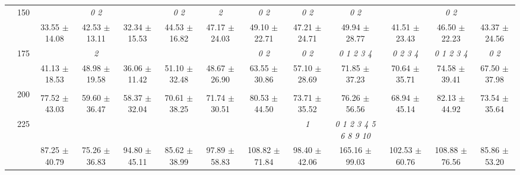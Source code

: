 \begin{table}[h]
{\begin{tabular}{
        ccccccccccccc}
 & \multirow{2}{*}{150}& & \textit{ 0 2 }& & \textit{ 0 2 }& \textit{ 2 }& \textit{ 0 2 }& \textit{ 0 2 }& \textit{ 0 2 }& & \textit{ 0 2 }&  \\ 
 & & 33.55 $\pm$ 14.08& 42.53 $\pm$ 13.11& 32.34 $\pm$ 15.53& 44.53 $\pm$ 16.82& 47.17 $\pm$ 24.03& 49.10 $\pm$ 22.71& 47.21 $\pm$ 24.71& 49.94 $\pm$ 28.77& 41.51 $\pm$ 23.43& 46.50 $\pm$ 22.23& 43.37 $\pm$ 24.56 \\ 
 & \multirow{2}{*}{175}& \cellcolor[HTML]{EFEFEF} & \cellcolor[HTML]{EFEFEF} \textit{ 2 }& \cellcolor[HTML]{EFEFEF} & \cellcolor[HTML]{EFEFEF} & \cellcolor[HTML]{EFEFEF} & \cellcolor[HTML]{EFEFEF} \textit{ 0 2 }& \cellcolor[HTML]{EFEFEF} \textit{ 0 2 }& \cellcolor[HTML]{EFEFEF} \textit{ 0 1 2 3 4 }& \cellcolor[HTML]{EFEFEF} \textit{ 0 2 3 4 }& \cellcolor[HTML]{EFEFEF} \textit{ 0 1 2 3 4 }& \cellcolor[HTML]{EFEFEF} \textit{ 0 2 } \\ 
 & & \cellcolor[HTML]{EFEFEF} 41.13 $\pm$ 18.53& \cellcolor[HTML]{EFEFEF} 48.98 $\pm$ 19.58& \cellcolor[HTML]{EFEFEF} 36.06 $\pm$ 11.42& \cellcolor[HTML]{EFEFEF} 51.10 $\pm$ 32.48& \cellcolor[HTML]{EFEFEF} 48.67 $\pm$ 26.90& \cellcolor[HTML]{EFEFEF} 63.55 $\pm$ 30.86& \cellcolor[HTML]{EFEFEF} 57.10 $\pm$ 28.69& \cellcolor[HTML]{EFEFEF} 71.85 $\pm$ 37.23& \cellcolor[HTML]{EFEFEF} 70.64 $\pm$ 35.71& \cellcolor[HTML]{EFEFEF} 74.58 $\pm$ 39.41& \cellcolor[HTML]{EFEFEF} 67.50 $\pm$ 37.98 \\ 
 & \multirow{2}{*}{200}& & & & & & & & & & &  \\ 
 & & 77.52 $\pm$ 43.03& 59.60 $\pm$ 36.47& 58.37 $\pm$ 32.04& 70.61 $\pm$ 38.25& 71.74 $\pm$ 30.51& 80.53 $\pm$ 44.50& 73.71 $\pm$ 35.52& 76.26 $\pm$ 56.56& 68.94 $\pm$ 45.14& 82.13 $\pm$ 44.92& 73.54 $\pm$ 35.64 \\ 
 & \multirow{2}{*}{225}& \cellcolor[HTML]{EFEFEF} & \cellcolor[HTML]{EFEFEF} & \cellcolor[HTML]{EFEFEF} & \cellcolor[HTML]{EFEFEF} & \cellcolor[HTML]{EFEFEF} & \cellcolor[HTML]{EFEFEF} & \cellcolor[HTML]{EFEFEF} \textit{ 1 }& \cellcolor[HTML]{EFEFEF} \textit{  0  1  2  3  4  5  6  8  9 10 }& \cellcolor[HTML]{EFEFEF} & \cellcolor[HTML]{EFEFEF} & \cellcolor[HTML]{EFEFEF}  \\ 
 & & \cellcolor[HTML]{EFEFEF} 87.25 $\pm$ 40.79& \cellcolor[HTML]{EFEFEF} 75.26 $\pm$ 36.83& \cellcolor[HTML]{EFEFEF} 94.80 $\pm$ 45.11& \cellcolor[HTML]{EFEFEF} 85.62 $\pm$ 38.99& \cellcolor[HTML]{EFEFEF} 97.89 $\pm$ 58.83& \cellcolor[HTML]{EFEFEF} 108.82 $\pm$ 71.84& \cellcolor[HTML]{EFEFEF} 98.40 $\pm$ 42.06& \cellcolor[HTML]{EFEFEF} 165.16 $\pm$ 99.03& \cellcolor[HTML]{EFEFEF} 102.53 $\pm$ 60.76& \cellcolor[HTML]{EFEFEF} 108.88 $\pm$ 76.56& \cellcolor[HTML]{EFEFEF} 85.86 $\pm$ 53.20 \\ 

\end{tabular}}
\end{table}
